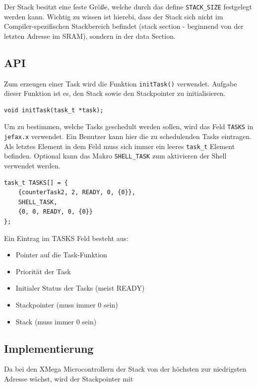 \documentclass[fontsize=12pt, toc=bibliography, notitlepage]{scrreprt}
\begin{document}
Der Stack besitzt eine feste Größe, welche durch das define \lstinline$STACK_SIZE$ festgelegt werden kann. Wichtig zu wissen ist hierebi, dass der Stack sich nicht im Compiler-spezifischen Stackbereich befindet (stack section - beginnend von der letzten Adresse im SRAM), sondern in der data  Section.

\subsection{API}
\label{subsec:tasks-api}
Zum erzeugen einer Task wird die Funktion \lstinline$initTask()$ verwendet. Aufgabe dieser Funktion ist es, den Stack sowie den Stackpointer zu initialisieren.

\begin{lstlisting}
void initTask(task_t *task);
\end{lstlisting}

Um zu bestimmen, welche Tasks geschedult werden sollen, wird das Feld \lstinline$TASKS$ in \lstinline$jefax.x$ verwendet. Ein Benutzer kann hier die zu schedulenden Tasks eintragen. Als letztes Element in dem Feld muss sich immer ein leeres \lstinline$task_t$ Element befinden. Optional kann das Makro \lstinline$SHELL_TASK$ zum aktivieren der Shell verwendet werden.

\begin{lstlisting}[title=jefax.c]
task_t TASKS[] = {
    {counterTask2, 2, READY, 0, {0}},
    SHELL_TASK,
    {0, 0, READY, 0, {0}}
};
\end{lstlisting}

Ein Eintrag im TASKS Feld besteht aus:

\begin{itemize}
\item Pointer auf die Task-Funktion
\item Priorität der Task
\item Initialer Status der Tasks (meist READY)
\item Stackpointer (muss immer 0 sein)
\item Stack (muss immer {0} sein)
\end{itemize}

\subsection{Implementierung}
\label{subsec:tasks-impl}
Da bei den XMega Microcontrollern der Stack von der höchsten zur niedrigsten Adresse wächst, wird der Stackpointer mit
\end{document}
